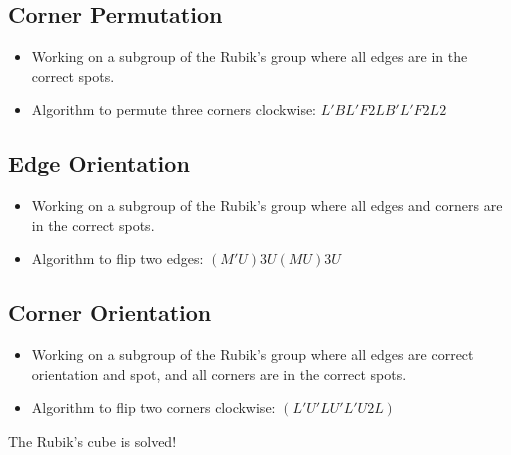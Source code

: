 \documentclass[xcolor=pdftex,dvipsnames,table]{beamer}
\begin{document}
\subsection{Corner Permutation}
\begin{frame}
  \begin{itemize}
    \item Working on a subgroup of the Rubik's group where all edges are in the correct spots.
    \item Algorithm to permute three corners clockwise: $L' B L' F2 L B' L' F2 L2$
  \end{itemize}
\end{frame}

\subsection{Edge Orientation}
\begin{frame}
  \begin{itemize}
    \item Working on a subgroup of the Rubik's group where all edges and corners are in the correct spots.
    \item Algorithm to flip two edges: $(M'U)3 U (MU)3 U$
  \end{itemize}
\end{frame}

\subsection{Corner Orientation}
\begin{frame}
  \begin{itemize}
    \item Working on a subgroup of the Rubik's group where all edges are correct orientation and spot, and all corners are in the correct spots.
    \item Algorithm to flip two corners clockwise: $(L' U' L U' L' U2 L)$
  \end{itemize}
  The Rubik's cube is solved!
\end{frame}
\end{document}
